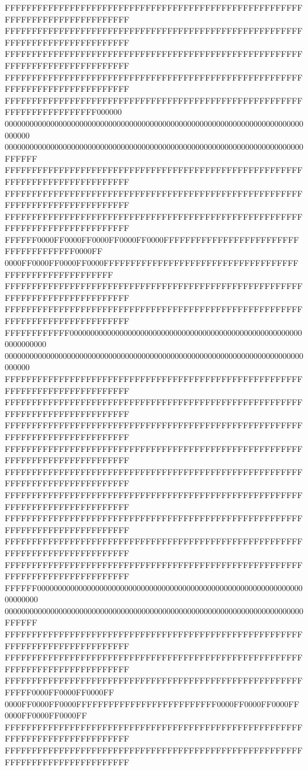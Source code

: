 FFFFFFFFFFFFFFFFFFFFFFFFFFFFFFFFFFFFFFFFFFFFFFFFFFFFFFFFFFFFFFFFFFFFFFFFFFFFFF
FFFFFFFFFFFFFFFFFFFFFFFFFFFFFFFFFFFFFFFFFFFFFFFFFFFFFFFFFFFFFFFFFFFFFFFFFFFFFF
FFFFFFFFFFFFFFFFFFFFFFFFFFFFFFFFFFFFFFFFFFFFFFFFFFFFFFFFFFFFFFFFFFFFFFFFFFFFFF
FFFFFFFFFFFFFFFFFFFFFFFFFFFFFFFFFFFFFFFFFFFFFFFFFFFFFFFFFFFFFFFFFFFFFFFFFFFFFF
FFFFFFFFFFFFFFFFFFFFFFFFFFFFFFFFFFFFFFFFFFFFFFFFFFFFFFFFFFFFFFFFFFFFFFFF000000
000000000000000000000000000000000000000000000000000000000000000000000000000000
000000000000000000000000000000000000000000000000000000000000000000000000FFFFFF
FFFFFFFFFFFFFFFFFFFFFFFFFFFFFFFFFFFFFFFFFFFFFFFFFFFFFFFFFFFFFFFFFFFFFFFFFFFFFF
FFFFFFFFFFFFFFFFFFFFFFFFFFFFFFFFFFFFFFFFFFFFFFFFFFFFFFFFFFFFFFFFFFFFFFFFFFFFFF
FFFFFFFFFFFFFFFFFFFFFFFFFFFFFFFFFFFFFFFFFFFFFFFFFFFFFFFFFFFFFFFFFFFFFFFFFFFFFF
FFFFFF0000FF0000FF0000FF0000FF0000FFFFFFFFFFFFFFFFFFFFFFFFFFFFFFFFFFFFFF0000FF
0000FF0000FF0000FF0000FFFFFFFFFFFFFFFFFFFFFFFFFFFFFFFFFFFFFFFFFFFFFFFFFFFFFFFF
FFFFFFFFFFFFFFFFFFFFFFFFFFFFFFFFFFFFFFFFFFFFFFFFFFFFFFFFFFFFFFFFFFFFFFFFFFFFFF
FFFFFFFFFFFFFFFFFFFFFFFFFFFFFFFFFFFFFFFFFFFFFFFFFFFFFFFFFFFFFFFFFFFFFFFFFFFFFF
FFFFFFFFFFFF000000000000000000000000000000000000000000000000000000000000000000
000000000000000000000000000000000000000000000000000000000000000000000000000000
FFFFFFFFFFFFFFFFFFFFFFFFFFFFFFFFFFFFFFFFFFFFFFFFFFFFFFFFFFFFFFFFFFFFFFFFFFFFFF
FFFFFFFFFFFFFFFFFFFFFFFFFFFFFFFFFFFFFFFFFFFFFFFFFFFFFFFFFFFFFFFFFFFFFFFFFFFFFF
FFFFFFFFFFFFFFFFFFFFFFFFFFFFFFFFFFFFFFFFFFFFFFFFFFFFFFFFFFFFFFFFFFFFFFFFFFFFFF
FFFFFFFFFFFFFFFFFFFFFFFFFFFFFFFFFFFFFFFFFFFFFFFFFFFFFFFFFFFFFFFFFFFFFFFFFFFFFF
FFFFFFFFFFFFFFFFFFFFFFFFFFFFFFFFFFFFFFFFFFFFFFFFFFFFFFFFFFFFFFFFFFFFFFFFFFFFFF
FFFFFFFFFFFFFFFFFFFFFFFFFFFFFFFFFFFFFFFFFFFFFFFFFFFFFFFFFFFFFFFFFFFFFFFFFFFFFF
FFFFFFFFFFFFFFFFFFFFFFFFFFFFFFFFFFFFFFFFFFFFFFFFFFFFFFFFFFFFFFFFFFFFFFFFFFFFFF
FFFFFFFFFFFFFFFFFFFFFFFFFFFFFFFFFFFFFFFFFFFFFFFFFFFFFFFFFFFFFFFFFFFFFFFFFFFFFF
FFFFFFFFFFFFFFFFFFFFFFFFFFFFFFFFFFFFFFFFFFFFFFFFFFFFFFFFFFFFFFFFFFFFFFFFFFFFFF
FFFFFF000000000000000000000000000000000000000000000000000000000000000000000000
000000000000000000000000000000000000000000000000000000000000000000000000FFFFFF
FFFFFFFFFFFFFFFFFFFFFFFFFFFFFFFFFFFFFFFFFFFFFFFFFFFFFFFFFFFFFFFFFFFFFFFFFFFFFF
FFFFFFFFFFFFFFFFFFFFFFFFFFFFFFFFFFFFFFFFFFFFFFFFFFFFFFFFFFFFFFFFFFFFFFFFFFFFFF
FFFFFFFFFFFFFFFFFFFFFFFFFFFFFFFFFFFFFFFFFFFFFFFFFFFFFFFFFFFF0000FF0000FF0000FF
0000FF0000FF0000FFFFFFFFFFFFFFFFFFFFFFFFFF0000FF0000FF0000FF0000FF0000FF0000FF
FFFFFFFFFFFFFFFFFFFFFFFFFFFFFFFFFFFFFFFFFFFFFFFFFFFFFFFFFFFFFFFFFFFFFFFFFFFFFF
FFFFFFFFFFFFFFFFFFFFFFFFFFFFFFFFFFFFFFFFFFFFFFFFFFFFFFFFFFFFFFFFFFFFFFFFFFFFFF
